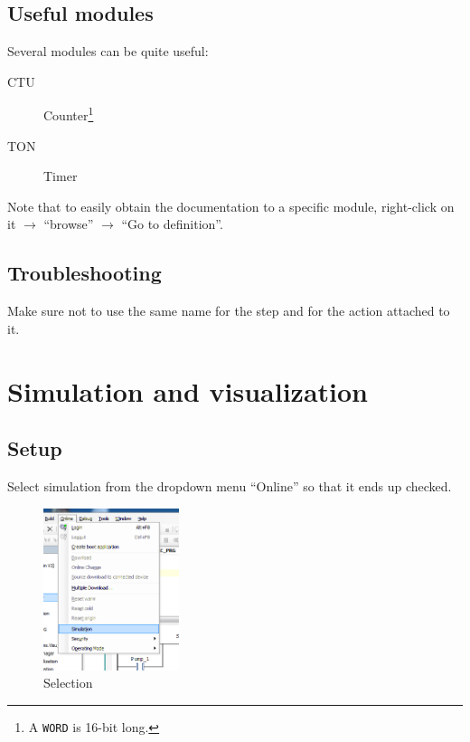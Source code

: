 \documentclass[10pt,a4paper]{article}
\begin{document}
\subsection{Useful modules}
Several modules can be quite useful:
\begin{description}
  \item[CTU] Counter\footnote{A \texttt{WORD} is 16-bit long.}
  \item[TON] Timer
\end{description}

Note that to easily obtain the documentation to a specific module, right-click on it $\rightarrow$ ``browse'' $\rightarrow$ ``Go to definition''.

\subsection{Troubleshooting}
Make sure not to use the same name for the step and for the action attached to it.




\section{Simulation and visualization}
\subsection{Setup}
Select simulation from the dropdown menu ``Online'' so that it ends up checked.

\begin{figure}[h!]
	\begin{center}
		\includegraphics[width=150px]{img9.png}
	\end{center}
\caption{Selection}
\label{fig:simu}
\end{figure}
\end{document}
